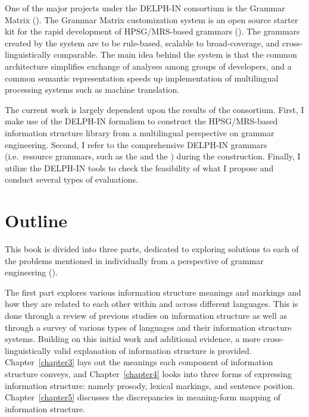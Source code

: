 One of the major projects under the DELPH-IN consortium is the \lingo
Grammar Matrix (\citealt{bender:etal:10}).  The \lingo Grammar Matrix
customization system is an open source starter kit for the rapid
development of HPSG/MRS-based grammars
().  The grammars
created by the system are to be rule-based, scalable to
broad-coverage, and cross-linguistically comparable. The main idea
behind the system is that the common architecture simplifies exchange
of analyses among groups of developers, and a common semantic
representation speeds up implementation of multilingual processing
systems such as machine translation.



The current work is largely dependent upon the results of the
 consortium.  First, I make use of the DELPH-IN
formalism to construct the HPSG/MRS-based information structure
library from a multilingual perspective on grammar
engineering. Second, I refer to the comprehensive DELPH-IN grammars
(i.e.\ resource grammars, such as the  and the )
during the construction. Finally, I utilize the DELPH-IN tools to
check the feasibility of what I propose and conduct several types of
evaluations.





\section{Outline}
\label{1:sec:outlines}

This book is divided into three parts, dedicated to exploring
solutions to each of the problems mentioned in 
individually from a perspective of grammar engineering
().


The first part explores various information structure meanings and
markings and how they are related to each other within and across
different languages.  This is done through a review of previous
studies on information structure as well as through a survey of
various types of languages and their information structure
systems. Building on this initial work and additional evidence, a more
cross-linguistically valid explanation of information structure is
provided. Chapter~\ref{chapter3} lays out the meanings each component
of information structure conveys, and Chapter~\ref{chapter4} looks
into three forms of expressing information structure: namely prosody,
lexical markings, and sentence position.  Chapter~\ref{chapter5}
discusses the discrepancies in meaning-form mapping of information
structure.




